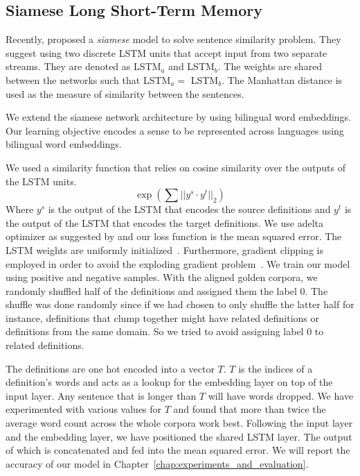 \subsection{Siamese Long Short-Term Memory}%
\label{sub:siamese_long_short_term_memory}

Recently, \textcite{mueller_siamese_2016} proposed a \emph{siamese} model to solve sentence similarity problem.
They suggest using two discrete LSTM units that accept input from two separate streams.
They are denoted as LSTM$_a$ and LSTM$_b$.
The weights are shared between the networks such that LSTM$_a = $ LSTM$_b$.
The Manhattan distance is used as the measure of similarity between the sentences.

We extend the siamese network architecture by using bilingual word embeddings.
Our learning objective encodes a sense to be represented across languages using bilingual word embeddings.

We used a similarity function that relies on cosine similarity over the outputs of the LSTM units.
\begin{equation}
    \exp(\sum{||y^{s}\cdot y^{t}}||_2)
\end{equation}
Where $y^{s}$ is the output of the LSTM that encodes the source definitions and $y^{t}$ is the output of the LSTM that encodes the target definitions.
We use adelta optimizer as suggested by \textcite{zeiler_adadelta_2012} and our loss function is the mean squared error.
The LSTM weights are uniformly initialized~\cite{glorot_understanding_2010}.
Furthermore, gradient clipping is employed in order to avoid the exploding gradient problem~\cite{pascanu_difficulty_2012}.
We train our model using positive and negative samples.
With the aligned golden corpora, we randomly shuffled half of the definitions and assigned them the label 0.
The shuffle was done randomly since if we had chosen to only shuffle the latter half for instance, definitions that clump together might have related definitions or definitions from the same domain.
So we tried to avoid assigning label 0 to related definitions.

The definitions are one hot encoded into a vector $T$.
$T$ is the indices of a definition's words and acts as a lookup for the embedding layer on top of the input layer.
Any sentence that is longer than $T$ will have words dropped.
We have experimented with various values for $T$ and found that more than twice the average word count across the whole corpora work best.
Following the input layer and the embedding layer, we have positioned the shared LSTM layer.
The output of which is concatenated and fed into the mean squared error.
We will report the accuracy of our model in Chapter~\ref{chap:experiments_and_evaluation}.
